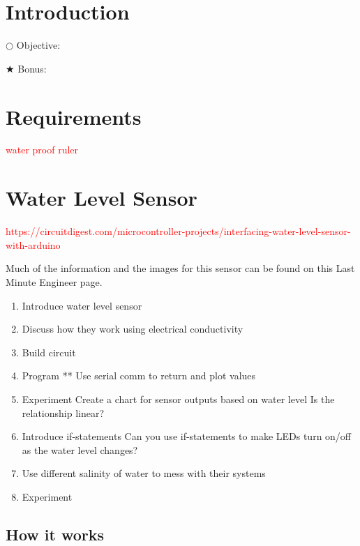 \documentclass[12pt]{article}
\begin{document}

\section{Introduction}


\noindent $\bigcirc$ Objective: 

\noindent $\bigstar$ Bonus: 


\section{Requirements}

\textcolor{red}{water proof ruler}

\section{Water Level Sensor}

\textcolor{red}{ https://circuitdigest.com/microcontroller-projects/interfacing-water-level-sensor-with-arduino }

Much of the information and the images for this sensor can be found on this Last Minute Engineer page\cite{LME_water_sensor}.

\begin{enumerate}
	\itemsep -1em
	\item Introduce water level sensor
	\item Discuss how they work using electrical conductivity
	\item Build circuit
	\item Program **
	\subitem Use serial comm to return and plot values
	
	\item Experiment
	\subitem Create a chart for sensor outputs based on water level
	\subitem Is the relationship linear?
	
	\item Introduce if-statements
	\subitem Can you use if-statements to make LEDs turn on/off as the water level changes?
	
	\item Use different salinity of water to mess with their systems
	
	\item Experiment
	\subitem 
	
\end{enumerate}

\subsection{How it works}
\end{document}
